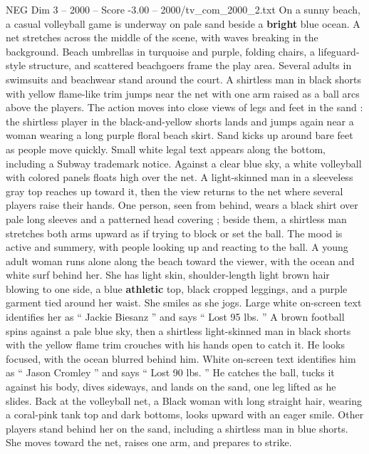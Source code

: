 \begin{textsample}{NEG Dim 3 – 2000 – Score -3.00 – 2000/tv\_com\_2000\_2.txt}  \label{ex:f3_neg_036}
On a sunny beach, a casual volleyball game is underway on pale sand beside a \textbf{bright} blue ocean.
A net stretches across the middle of the scene, with waves breaking in the background.
Beach umbrellas in turquoise and purple, folding chairs, a lifeguard-style structure, and scattered beachgoers frame the play area.
Several adults in swimsuits and beachwear stand around the court.
A shirtless man in black shorts with yellow flame-like trim jumps near the net with one arm raised as a ball arcs above the players.
The action moves into close views of legs and feet in the sand : the shirtless player in the black-and-yellow shorts lands and jumps again near a woman wearing a long purple floral beach skirt.
Sand kicks up around bare feet as people move quickly.
Small white legal text appears along the bottom, including a Subway trademark notice.
Against a clear blue sky, a white volleyball with colored panels floats high over the net.
A light-skinned man in a sleeveless gray top reaches up toward it, then the view returns to the net where several players raise their hands.
One person, seen from behind, wears a black shirt over pale long sleeves and a patterned head covering ; beside them, a shirtless man stretches both arms upward as if trying to block or set the ball.
The mood is active and summery, with people looking up and reacting to the ball.
A young adult woman runs alone along the beach toward the viewer, with the ocean and white surf behind her.
She has light skin, shoulder-length light brown hair blowing to one side, a blue \textbf{athletic} top, black cropped leggings, and a purple garment tied around her waist.
She smiles as she jogs.
Large white on-screen text identifies her as “ Jackie Biesanz ” and says “ Lost 95 lbs. ” A brown football spins against a pale blue sky, then a shirtless light-skinned man in black shorts with the yellow flame trim crouches with his hands open to catch it.
He looks focused, with the ocean blurred behind him.
White on-screen text identifies him as “ Jason Cromley ” and says “ Lost 90 lbs. ” He catches the ball, tucks it against his body, dives sideways, and lands on the sand, one leg lifted as he slides.
Back at the volleyball net, a Black woman with long straight hair, wearing a coral-pink tank top and dark bottoms, looks upward with an eager smile.
Other players stand behind her on the sand, including a shirtless man in blue shorts.
She moves toward the net, raises one arm, and prepares to strike.

\end{textsample}
